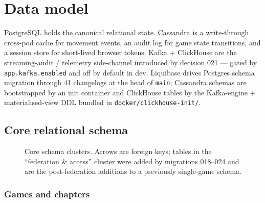 \chapter{Data model}\label{ch:datamodel}

PostgreSQL holds the canonical relational state. Cassandra is a
write-through cross-pod cache for movement events, an audit log for game
state transitions, and a session store for short-lived browser tokens.
Kafka + ClickHouse are the streaming-audit / telemetry side-channel
introduced by decision 021 — gated by \texttt{app.kafka.enabled} and off
by default in dev. Liquibase drives Postgres schema migration through 41
changelogs at the head of \texttt{main}; Cassandra schemas are
bootstrapped by an init container and ClickHouse tables by the
Kafka-engine + materialised-view DDL bundled in
\texttt{docker/clickhouse-init/}.

\section{Core relational schema}

\begin{figure}[!h]
\centering
{}
\caption{Core schema clusters. Arrows are foreign keys; tables in the
\enquote{federation \& access} cluster were added by migrations 018–024 and
are the post-federation additions to a previously single-game schema.}
\end{figure}

\subsection{Games and chapters}

